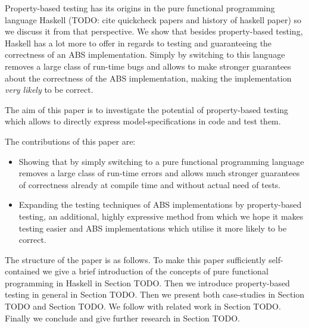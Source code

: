 Property-based testing has its origins in the pure functional programming language Haskell (TODO: cite quickcheck papers and history of haskell paper) so we discuss it from that perspective. We show that besides property-based testing, Haskell has a lot more to offer in regards to testing and guaranteeing the correctness of an ABS implementation. Simply by switching to this language removes a large class of run-time bugs and allows to make stronger guarantees about the correctness of the ABS implementation, making the implementation \textit{very likely} to be correct.

The aim of this paper is to investigate the potential of property-based testing which allows to directly express model-specifications in code and test them. 

The contributions of this paper are:
\begin{itemize}
	\item Showing that by simply switching to a pure functional programming language removes a large class of run-time errors and allows much stronger guarantees of correctness already at compile time and without actual need of tests.
	\item Expanding the testing techniques of ABS implementations by property-based testing, an additional, highly expressive method from which we hope it makes testing easier and ABS implementations which utilise it more likely to be correct.
\end{itemize}

The structure of the paper is as follows. To make this paper sufficiently self-contained we give a brief introduction of the concepts of pure functional programming in Haskell in Section TODO. Then we introduce property-based testing in general in Section TODO. Then we present both case-studies in Section TODO and Section TODO. We follow with related work in Section TODO. Finally we conclude and give further research in Section TODO. 